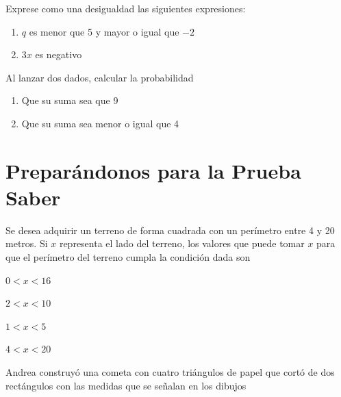 \documentclass[letterpaper,fleqn]{article}
\begin{document}
\begin{enumerate}
\begin{enumerate}
\begin{multicols}{2}
    \end{multicols}
  \end{enumerate}
  \item Exprese como una desigualdad las siguientes expresiones:
  \begin{enumerate}
    \item $ q $ es menor que 5 y mayor o igual que $ -2 $ \hspace*{1cm} \underline{\hspace*{4cm}}
    \item $3x$ es negativo \hspace*{1cm} \underline{\hspace*{4cm}}
  \end{enumerate}
  \item Al lanzar dos dados, calcular la probabilidad
  \begin{enumerate}
  \item Que su suma sea que 9
  \item Que su suma sea menor o igual que 4
  \end{enumerate}
   \section*{Preparándonos para la Prueba Saber}
\item Se desea adquirir un terreno de forma cuadrada con un perímetro entre 4 y 20 metros. Si $x$ representa el lado del terreno, los valores que puede tomar $x$ para que el
perímetro del terreno cumpla la condición dada son
\begin{enumerate}
\begin{multicols}{4}
\item $0<x<16$
\item $2<x<10$
\item $1<x<5$
\item $4<x<20$
\end{multicols}
\end{enumerate}
\begin{minipage}{.4\textwidth}
\item Andrea construyó una cometa con cuatro triángulos de papel que cortó de dos rectángulos con las medidas que se señalan en los dibujos
\end{minipage}
\begin{minipage}{.55\textwidth}
\end{minipage}


\end{enumerate}
\end{document}
